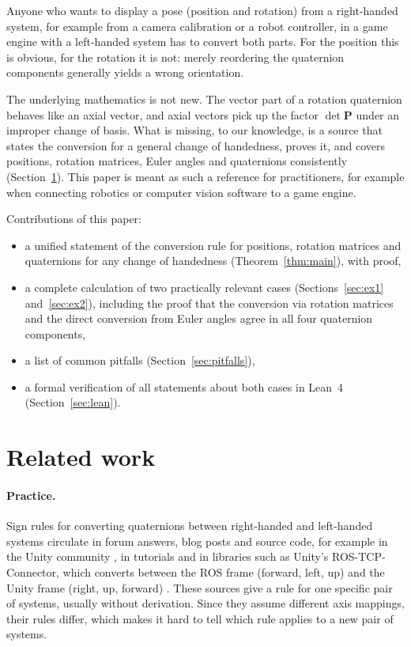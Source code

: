 \documentclass{article}
\theoremstyle{plain}
\theoremstyle{definition}
\newcommand{\vect}[1]{\boldsymbol{#1}}
\begin{document}
Anyone who wants to display a pose (position and rotation) from a right-handed system, for
example from a camera calibration or a robot controller, in a game engine with a left-handed
system has to convert both parts. For the position this is obvious, for the rotation it is not:
merely reordering the quaternion components generally yields a wrong orientation.

The underlying mathematics is not new. The vector part of a rotation quaternion behaves like an
axial vector, and axial vectors pick up the factor $\det \vect P$ under an improper change of basis.
What is missing, to our knowledge, is a source that states the conversion for a general change of
handedness, proves it, and covers positions, rotation matrices, Euler angles and quaternions
consistently (Section~\ref{sec:related}). This paper is meant as such a reference for practitioners,
for example when connecting robotics or computer vision software to a game engine.

Contributions of this paper:
\begin{itemize}
  \item a unified statement of the conversion rule for positions, rotation matrices and
        quaternions for any change of handedness (Theorem~\ref{thm:main}), with proof,
  \item a complete calculation of two practically relevant cases
        (Sections~\ref{sec:ex1} and~\ref{sec:ex2}), including the proof that the conversion via
        rotation matrices and the direct conversion from Euler angles agree in all four
        quaternion components,
  \item a list of common pitfalls (Section~\ref{sec:pitfalls}),
  \item a formal verification of all statements about both cases in Lean~4
        (Section~\ref{sec:lean}).
\end{itemize}

\section{Related work}\label{sec:related}

\paragraph{Practice.} Sign rules for converting quaternions between right-handed and left-handed
systems circulate in forum answers, blog posts and source code, for example in the Unity
community \cite{unityforum}, in tutorials \cite{codeproject} and in libraries such as Unity's
ROS-TCP-Connector, which converts between the ROS frame (forward, left, up) and the Unity frame
(right, up, forward) \cite{rosgeometry}. These sources give a rule for one specific pair of
systems, usually without derivation. Since they assume different axis mappings, their rules
differ, which makes it hard to tell which rule applies to a new pair of systems.
\end{document}
